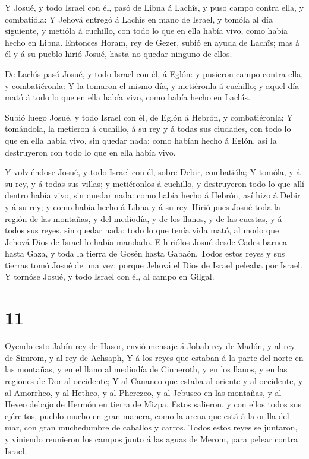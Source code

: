  Y Josué, y todo Israel con él, pasó de Libna á Lachîs, y
puso campo contra ella, y combatióla:  Y Jehová entregó á
Lachîs en mano de Israel, y tomóla al día siguiente, y metióla á
cuchillo, con todo lo que en ella había vivo, como había hecho en Libna.
 Entonces Horam, rey de Gezer, subió en ayuda de Lachîs;
mas á él y á su pueblo hirió Josué, hasta no quedar ninguno de ellos.

 De Lachîs pasó Josué, y todo Israel con él, á Eglón: y
pusieron campo contra ella, y combatiéronla:  Y la tomaron
el mismo día, y metiéronla á cuchillo; y aquel día mató á todo lo que en
ella había vivo, como había hecho en Lachîs.

 Subió luego Josué, y todo Israel con él, de Eglón á
Hebrón, y combatiéronla;  Y tomándola, la metieron á
cuchillo, á su rey y á todas sus ciudades, con todo lo que en ella había
vivo, sin quedar nada: como habían hecho á Eglón, así la destruyeron con
todo lo que en ella había vivo.

 Y volviéndose Josué, y todo Israel con él, sobre Debir,
combatióla;  Y tomóla, y á su rey, y á todas sus villas; y
metiéronlos á cuchillo, y destruyeron todo lo que allí dentro había
vivo, sin quedar nada: como había hecho á Hebrón, así hizo á Debir y á
su rey; y como había hecho á Libna y á su rey.  Hirió pues
Josué toda la región de las montañas, y del mediodía, y de los llanos, y
de las cuestas, y á todos sus reyes, sin quedar nada; todo lo que tenía
vida mató, al modo que Jehová Dios de Israel lo había mandado.
 E hiriólos Josué desde Cades-barnea hasta Gaza, y toda la
tierra de Gosén hasta Gabaón.  Todos estos reyes y sus
tierras tomó Josué de una vez; porque Jehová el Dios de Israel peleaba
por Israel.  Y tornóse Josué, y todo Israel con él, al
campo en Gilgal.

\hypertarget{section-10}{%
\section{11}\label{section-10}}

 Oyendo esto Jabín rey de Hasor, envió mensaje á Jobab rey
de Madón, y al rey de Simrom, y al rey de Achsaph,  Y á los
reyes que estaban á la parte del norte en las montañas, y en el llano al
mediodía de Cinneroth, y en los llanos, y en las regiones de Dor al
occidente;  Y al Cananeo que estaba al oriente y al
occidente, y al Amorrheo, y al Hetheo, y al Pherezeo, y al Jebuseo en
las montañas, y al Heveo debajo de Hermón en tierra de Mizpa.
 Estos salieron, y con ellos todos sus ejércitos, pueblo
mucho en gran manera, como la arena que está á la orilla del mar, con
gran muchedumbre de caballos y carros.  Todos estos reyes se
juntaron, y viniendo reunieron los campos junto á las aguas de Merom,
para pelear contra Israel.

